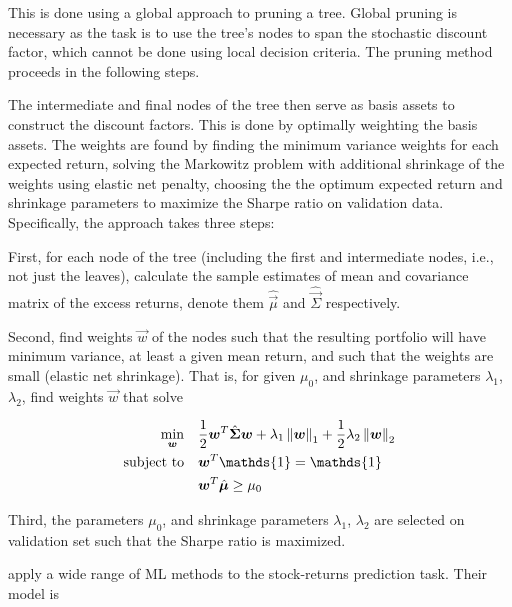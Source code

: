 {	   		 This is done using a global approach to pruning a tree. Global pruning is necessary as the task is to use the tree's nodes to span the stochastic discount factor, which cannot be done using local decision criteria.
	   		 The pruning method proceeds in the following steps. 	
	   		 
	   		 The intermediate and final nodes of the tree then serve as basis assets to construct the discount factors. This is done by optimally weighting the basis assets. The weights are found by finding the minimum variance weights for each expected return, solving the Markowitz problem with additional shrinkage of the weights using elastic net penalty, choosing the the optimum expected return and shrinkage parameters to maximize the Sharpe ratio on validation data. Specifically, the approach takes three steps: 
	   		 
	   		 First, for each node of the tree (including the first and intermediate nodes, i.e., not just the leaves), calculate the sample estimates of mean and covariance matrix of the excess returns, denote them $\hat{\vec{\mu}}$ and $\hat{\vec{\Sigma}}$ respectively.
	   		 
	   		 Second, find weights $\vec{w}$ of the nodes such that the resulting portfolio will have minimum variance, at least a given mean return, and such that the weights are small (elastic net shrinkage). That is, for given $\mu_0$, and shrinkage parameters $\lambda_1$, $\lambda_2$, find weights $\vec{w}$ that solve 
	   		 
	   		 \begin{equation}
	   		 \begin{aligned}
	   		 \min_{\vec{w}} \quad 
	   		 & \frac{1}{2}\vec{w}^{T} \hat{\vec{\Sigma}} \vec{w} + \lambda_1 \norm{\vec{w}}_1 +  			\frac{1}{2} \lambda_2 \norm{\vec{w}}_2 \\
	   		 \textrm{subject to} \quad 
	   		 & \vec{w}^{T} \mathds{1} = \mathds{1} \\
	   		 & \vec{w}^{T}\hat{\vec{\mu}} \geq \mu_0   \\
	   		 \end{aligned}
	   		 \end{equation}
	   		 
	   		 Third, the parameters $\mu_0$, and shrinkage parameters $\lambda_1$, $\lambda_2$ are selected on validation set such that the Sharpe ratio is maximized. 
	   		 
	   		 \cite{gu2020empirical} apply a wide range of ML methods to the stock-returns prediction task. Their model is 
	   		 
}
